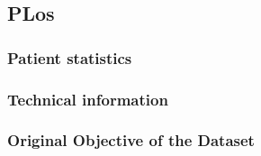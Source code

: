 \subsection{PLos}

\subsubsection{Patient statistics}

\subsubsection{Technical information}

\subsubsection{Original Objective of the Dataset}